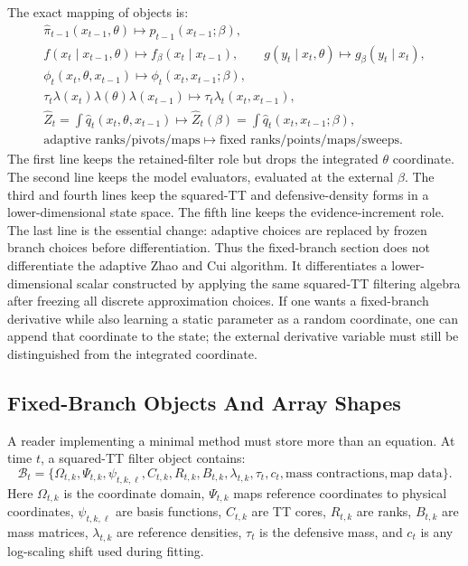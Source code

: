 \documentclass[11pt]{article}
\numberwithin{equation}{section}
\begin{document}
The exact mapping of objects is:
\begin{equation}
\begin{gathered}
\widehat\pi_{t-1}(x_{t-1},\theta)
\mapsto
\widehat p_{t-1}(x_{t-1};\beta),\\
f(x_t\mid x_{t-1},\theta)\mapsto f_\beta(x_t\mid x_{t-1}),
\qquad
g(y_t\mid x_t,\theta)\mapsto g_\beta(y_t\mid x_t),\\
\phi_t(x_t,\theta,x_{t-1})
\mapsto
\phi_t(x_t,x_{t-1};\beta),\\
\tau_t\lambda(x_t)\lambda(\theta)\lambda(x_{t-1})
\mapsto
\tau_t\lambda_t(x_t,x_{t-1}),\\
\widehat Z_t
=
\int\widehat q_t(x_t,\theta,x_{t-1})
\mapsto
\widehat Z_t(\beta)
=
\int\widehat q_t(x_t,x_{t-1};\beta),\\
\text{adaptive ranks/pivots/maps}
\mapsto
\text{fixed ranks/points/maps/sweeps}.
\end{gathered}
\label{eq:p24-r3}
\end{equation}
The first line keeps the retained-filter role but drops the integrated
\(\theta\) coordinate.  The second line keeps the model evaluators, evaluated at
the external \(\beta\).  The third and fourth lines keep the squared-TT and
defensive-density forms in a lower-dimensional state space.  The fifth line
keeps the evidence-increment role.  The last line is the essential change:
adaptive choices are replaced by frozen branch choices before differentiation.
Thus the fixed-branch section does not differentiate the adaptive Zhao and Cui \cite{zhao2024ttsequential}
algorithm.  It differentiates a lower-dimensional scalar constructed by applying
the same squared-TT filtering algebra after freezing all discrete approximation
choices.  If one wants a fixed-branch derivative while also learning a static
parameter as a random coordinate, one can append that coordinate to the state;
the external derivative variable must still be distinguished from the
integrated coordinate.

\subsection{Fixed-Branch Objects And Array Shapes}

A reader implementing a minimal method must store more than an equation.  At
time \(t\), a squared-TT filter object contains:
\[
    \mathcal B_t
    =
    \{
    \Omega_{t,k},\Psi_{t,k},\psi_{t,k,\ell},C_{t,k},
    R_{t,k},B_{t,k},\lambda_{t,k},\tau_t,c_t,
    \text{mass contractions},\text{map data}
    \}.
\]
Here \(\Omega_{t,k}\) is the coordinate domain, \(\Psi_{t,k}\) maps reference
coordinates to physical coordinates, \(\psi_{t,k,\ell}\) are basis functions,
\(C_{t,k}\) are TT cores, \(R_{t,k}\) are ranks, \(B_{t,k}\) are mass matrices,
\(\lambda_{t,k}\) are reference densities, \(\tau_t\) is the defensive mass, and
\(c_t\) is any log-scaling shift used during fitting.
\end{document}
